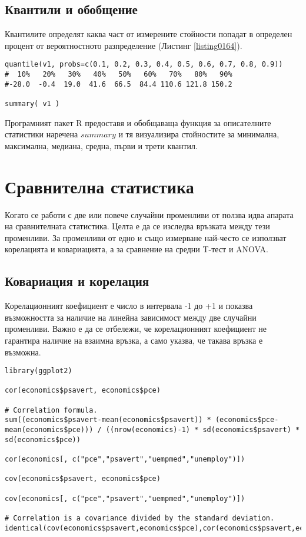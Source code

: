 \subsection{Квантили и обобщение}

Квантилите определят каква част от измерените стойности попадат в определен процент от вероятностното разпределение (Листинг \ref{listing0164}).

\begin{lstlisting}[caption=Квантили и обобщение, label=listing0165]
quantile(v1, probs=c(0.1, 0.2, 0.3, 0.4, 0.5, 0.6, 0.7, 0.8, 0.9))
#  10%   20%   30%   40%   50%   60%   70%   80%   90% 
#-28.0  -0.4  19.0  41.6  66.5  84.4 110.6 121.8 150.2 

summary( v1 )
\end{lstlisting}

Програмният пакет R предоставя и обобщаваща функция за описателните статистики наречена $summary$ и тя визуализира стойностите за минимална, максимална, медиана, средна, първи и трети квантил.

\section{Сравнителна статистика}

Когато се работи с две или повече случайни променливи от ползва идва апарата на сравнителната статистика. Целта е да се изследва връзката между тези променливи. За променливи от едно и също измерване най-често се използват корелацията и ковариацията, а за сравнение на средни T-тест и ANOVA\cite{anova}. 

\subsection{Ковариация и корелация}

Корелационният коефициент е число в интервала -1 до +1 и показва възможността за наличие на линейна зависимост между две случайни променливи. Важно е да се отбележи, че корелационният коефициент не гарантира наличие на взаимна връзка, а само указва, че такава връзка е възможна. 

\begin{lstlisting}[caption=Ковариация и корелация, label=listing0166]
library(ggplot2)

cor(economics$psavert, economics$pce)

# Correlation formula.
sum((economics$psavert-mean(economics$psavert)) * (economics$pce-mean(economics$pce))) / ((nrow(economics)-1) * sd(economics$psavert) * sd(economics$pce))

cor(economics[, c("pce","psavert","uempmed","unemploy")])

cov(economics$psavert, economics$pce)

cov(economics[, c("pce","psavert","uempmed","unemploy")])

# Correlation is a covariance divided by the standard deviation.
identical(cov(economics$psavert,economics$pce),cor(economics$psavert,economics$pce)*sd(economics$psavert)*sd(economics$pce))
\end{lstlisting}

